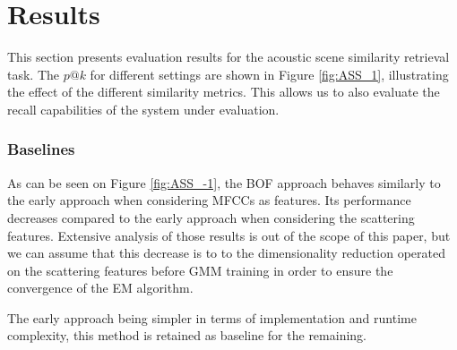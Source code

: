 \documentclass[smallextended]{svjour3}
\newcommand{\ja}[1]{\textcolor{magenta}{Joakim : #1}}
\begin{document}

\section{Results \label{sec:results}}



This section presents evaluation results for the acoustic scene similarity retrieval task. The $p@k$ for different settings are shown in Figure \ref{fig:ASS_1}, illustrating the effect of the different similarity metrics. This allows us to also evaluate the recall capabilities of the system under evaluation.

\subsubsection*{Baselines}

As can be seen on Figure \ref{fig:ASS_-1}, the BOF approach behaves similarly to the early approach when considering MFCCs as features. Its performance decreases compared to the early approach when considering the scattering features. Extensive analysis of those results is out of the scope of this paper, but we can assume that this decrease is to to the dimensionality reduction operated on the scattering features before GMM training in order to ensure the convergence of the EM algorithm.

The early approach being simpler in terms of implementation and runtime complexity, this method is retained as baseline for the remaining.
\end{document}

